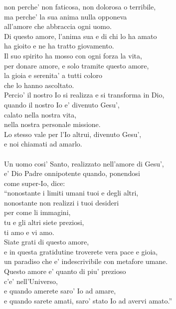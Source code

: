 \begin{haiku}
    non perche' non faticosa, non dolorosa o terribile,\\
    ma perche' la sua anima nulla opponeva\\
    all'amore che abbraccia ogni uomo.\\
    Di questo amore, l'anima sua e di chi lo ha amato\\
    ha gioito e ne ha tratto giovamento.\\
    Il suo spirito ha mosso con ogni forza la vita,\\
    per donare amore, e solo tramite questo amore,\\
    la gioia e serenita' a tutti coloro\\
    che lo hanno ascoltato.\\
    Percio' il nostro Io si realizza e si transforma in Dio, \\
    quando il nostro Io e' divenuto Gesu',\\
    calato nella nostra vita,\\
    nella nostra personale missione.\\
    Lo stesso vale per l'Io altrui, divenuto Gesu',\\
    e noi chiamati ad amarlo.\\
    \leavevmode\\
    Un uomo cosi' Santo, realizzato nell'amore di Gesu', \\
    e' Dio Padre onnipotente quando, ponendosi\\
    come super-Io, dice:\\
    ``nonostante i limiti umani tuoi e degli altri,\\
    nonostante non realizzi i tuoi desideri\\
    per come li immagini,\\
    tu e gli altri siete preziosi,\\
    ti amo e vi amo.\\
    Siate grati di questo amore,\\
    e in questa gratidutine
    troverete vera pace e gioia,\\
    un paradiso che e' indescrivibile con metafore umane.\\
    Questo amore e' quanto di piu' prezioso \\
    c'e' nell'Universo,\\
    e quando amerete saro' Io ad amare,\\
    e quando sarete amati, saro' stato Io ad avervi amato.''\\

\end{haiku}
